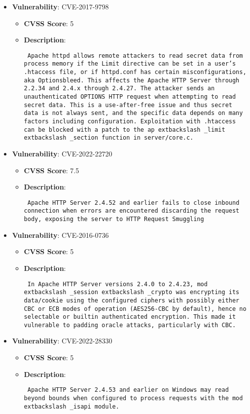 \documentclass{article}
\begin{document}
\begin{itemize}
        \item \textbf{Vulnerability}: CVE-2017-9798
        \begin{itemize}
            \item \textbf{CVSS Score}:  5 
            \item \textbf{Description}: \parbox{\linewidth}{\texttt{ Apache httpd allows remote attackers to read secret data from process memory if the Limit directive can be set in a user's .htaccess file, or if httpd.conf has certain misconfigurations, aka Optionsbleed. This affects the Apache HTTP Server through 2.2.34 and 2.4.x through 2.4.27. The attacker sends an unauthenticated OPTIONS HTTP request when attempting to read secret data. This is a use-after-free issue and thus secret data is not always sent, and the specific data depends on many factors including configuration. Exploitation with .htaccess can be blocked with a patch to the ap	extbackslash _limit	extbackslash _section function in server/core.c. }}
        \end{itemize}
    
        \item \textbf{Vulnerability}: CVE-2022-22720
        \begin{itemize}
            \item \textbf{CVSS Score}:  7.5 
            \item \textbf{Description}: \parbox{\linewidth}{\texttt{ Apache HTTP Server 2.4.52 and earlier fails to close inbound connection when errors are encountered discarding the request body, exposing the server to HTTP Request Smuggling }}
        \end{itemize}
    
        \item \textbf{Vulnerability}: CVE-2016-0736
        \begin{itemize}
            \item \textbf{CVSS Score}:  5 
            \item \textbf{Description}: \parbox{\linewidth}{\texttt{ In Apache HTTP Server versions 2.4.0 to 2.4.23, mod	extbackslash _session	extbackslash _crypto was encrypting its data/cookie using the configured ciphers with possibly either CBC or ECB modes of operation (AES256-CBC by default), hence no selectable or builtin authenticated encryption. This made it vulnerable to padding oracle attacks, particularly with CBC. }}
        \end{itemize}
    
        \item \textbf{Vulnerability}: CVE-2022-28330
        \begin{itemize}
            \item \textbf{CVSS Score}:  5 
            \item \textbf{Description}: \parbox{\linewidth}{\texttt{ Apache HTTP Server 2.4.53 and earlier on Windows may read beyond bounds when configured to process requests with the mod	extbackslash _isapi module. }}
        \end{itemize}
    

\end{itemize}
\end{document}
